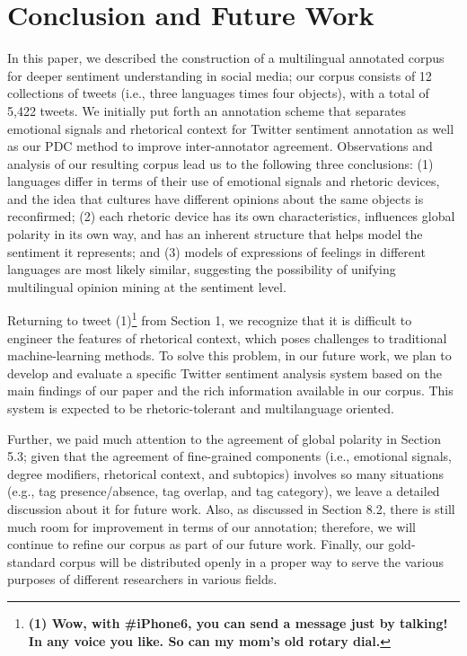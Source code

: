 \documentclass[english]{jnlp_1.4}
\begin{document}
\section{Conclusion and Future Work}
\vspace{-0.3\Cvs}

In this paper, we described the construction of a multilingual annotated corpus for deeper sentiment understanding in social media; our corpus consists of 12 collections of tweets (i.e., three languages times four objects), with a total of 5,422 tweets. We initially put forth an annotation scheme that separates emotional signals and rhetorical context for Twitter sentiment annotation as well as our PDC method to improve inter-annotator agreement. Observations and analysis of our resulting corpus lead us to the following three conclusions: (1) languages differ in terms of their use of emotional signals and rhetoric devices, and the idea that cultures have different opinions about the same objects is reconfirmed; (2) each rhetoric device has its own characteristics, influences global polarity in its own way, and has an inherent structure that helps model the sentiment it represents; and (3) models of expressions of feelings in different languages are most likely similar, suggesting the possibility of unifying multilingual opinion mining at the sentiment level.

Returning to tweet (1)\footnote{{\bf (1) Wow, with \#iPhone6, you can send a message just by talking! In any voice you like. So can my mom's old rotary dial.}} from Section 1, we recognize that it is difficult to engineer the features of rhetorical context, which poses challenges to traditional machine-learning methods. To solve this problem, in our future work, we plan to develop and evaluate a specific Twitter sentiment analysis system based on the main findings of our paper and the rich information available in our corpus. This system is expected to be rhetoric-tolerant and multilanguage oriented.

Further, we paid much attention to the agreement of global polarity in Section 5.3; given that the agreement of fine-grained components (i.e., emotional signals, degree modifiers, rhetorical context, and subtopics) involves so many situations (e.g., tag presence/absence, tag overlap, and tag category), we leave a detailed discussion about it for future work. Also, as discussed in Section 8.2, there is still much room for improvement in terms of our annotation; therefore, we will continue to refine our corpus as part of our future work. Finally, our gold-standard corpus will be distributed openly in a proper way to serve the various purposes of different researchers in various fields.
\end{document}
